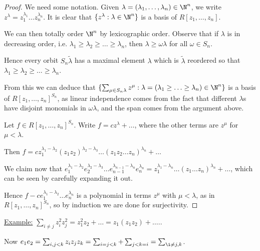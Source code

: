 \documentclass[a4paper, 10pt, twocolumn]{amsart}
\begin{document}
\begin{proof}
We need some notation. Given $\lambda = (\lambda_1, \ldots, \lambda_n) \in \N^n$, we write $z^{\lambda} = z_1^{\lambda_1}\ldots z_n^{\lambda_n}$. It is clear that $\{z^{\lambda} : \lambda \in \N^n\}$ is a basis of $R[z_1, \ldots, z_n]$.

We can then totally order $\N^n$ by lexicographic order. Observe that if $\lambda$ is in decreasing order, i.e. $\lambda_1 \geq \lambda_2 \geq \ldots \geq \lambda_n$, then $\lambda \geq \omega \lambda$ for all $\omega \in S_n$.

Hence every orbit $S_n \tilde{\lambda}$ has a maximal element $\lambda$ which is $\tilde{\lambda}$ reordered so that $\lambda_1 \geq \lambda_2 \geq \ldots \geq \lambda_n$.

From this we can deduce that $\{\sum_{\mu \in S_n \lambda} z^{\mu} : \lambda = (\lambda_1 \geq \ldots \geq \lambda_n) \in \N^n\}$ is a basis of $R[z_1, \ldots, z_n]^{S_n}$, as linear independence comes from the fact that different $\lambda$s have disjoint monomials in $\omega\lambda$, and the span comes from the argument above.

Let $f \in R[z_1, \ldots, z_n]^{S_n}$. Write $f = cz^{\lambda} + \ldots$, where the other terms are $z^{\mu}$ for $\mu < \lambda$.

Then $f = cz_1^{\lambda_1-\lambda_2}(z_1z_2)^{\lambda_2-\lambda_3}\ldots(z_1z_2 \ldots z_n)^{\lambda_n} + \ldots$

We claim now that $e_1^{\lambda_1-\lambda_2}e_2^{\lambda_2-\lambda_3}\ldots e_{n-1}^{\lambda_{n-1}-\lambda_n} e_n^{\lambda_n} = z_1^{\lambda_1-\lambda_n}\ldots (z_1\ldots z_n)^{\lambda_n} + \ldots$, which can be seen by carefully expanding it out.

Hence $f-ce_1^{\lambda_1 - \lambda_2}\ldots e_n^{\lambda_n}$ is a polynomial in terms $z^{\mu}$ with $\mu < \lambda$, as in $R[z_1, \ldots, z_n]^{S_n}$, so by induction we are done for surjectivity.
\end{proof}

\underline{Example:} $\sum_{i\neq j} z_i^2 z_j^2 = z_1^2 z_2 + \ldots = z_1(z_1z_2) + \ldots.$.

Now $e_1e_2 = \sum_{i, j<k} z_iz_jz_k = \sum_{i=j<k} +\sum_{j<k=i} = \sum_{\i\neq j, k}$.
\end{document}
